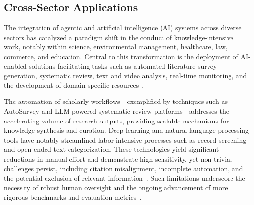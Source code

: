 \documentclass[sigconf]{acmart}
\begin{document}
\subsection{Cross-Sector Applications}

The integration of agentic and artificial intelligence (AI) systems across diverse sectors has catalyzed a paradigm shift in the conduct of knowledge-intensive work, notably within science, environmental management, healthcare, law, commerce, and education. Central to this transformation is the deployment of AI-enabled solutions facilitating tasks such as automated literature survey generation, systematic review, text and video analysis, real-time monitoring, and the development of domain-specific resources~\cite{ref6,ref7,ref8,ref9,ref10,ref14,ref25,ref26,ref27,ref28,ref29,ref30,ref40,ref45,ref58,ref59,ref76,ref80,ref86,ref88,ref91,ref92,ref93,ref94,ref95,ref96,ref97,ref98,ref99,ref100,ref104,ref109,ref110,ref111,ref112,ref113,ref114,ref115}. 

The automation of scholarly workflows—exemplified by techniques such as AutoSurvey and LLM-powered systematic review platforms—addresses the accelerating volume of research outputs, providing scalable mechanisms for knowledge synthesis and curation. Deep learning and natural language processing tools have notably streamlined labor-intensive processes such as record screening and open-ended text categorization. These technologies yield significant reductions in manual effort and demonstrate high sensitivity, yet non-trivial challenges persist, including citation misalignment, incomplete automation, and the potential exclusion of relevant information~\cite{ref25,ref26,ref27,ref28,ref29,ref30,ref45,ref58,ref59,ref76,ref80,ref86,ref88,ref91,ref92,ref93,ref94,ref95,ref96,ref97,ref98,ref99,ref100,ref104}. Such limitations underscore the necessity of robust human oversight and the ongoing advancement of more rigorous benchmarks and evaluation metrics~\cite{ref29,ref30,ref45,ref99,ref100,ref104}.
\end{document}
